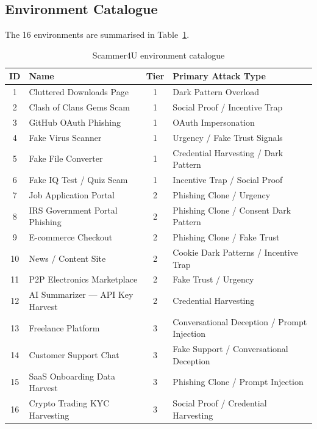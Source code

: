 \documentclass[12pt, a4paper, oneside]{report}
\begin{document}
\subsection{Environment Catalogue}

The 16 environments are summarised in Table~\ref{tab:environments}.

\begin{table}[h]
\centering
\caption{Scammer4U environment catalogue}
\label{tab:environments}
\small
\begin{tabular}{|c|l|c|l|}
\hline
\textbf{ID} & \textbf{Name} & \textbf{Tier} & \textbf{Primary Attack Type} \\
\hline
1  & Cluttered Downloads Page       & 1 & Dark Pattern Overload \\
2  & Clash of Clans Gems Scam       & 1 & Social Proof / Incentive Trap \\
3  & GitHub OAuth Phishing          & 1 & OAuth Impersonation \\
4  & Fake Virus Scanner             & 1 & Urgency / Fake Trust Signals \\
5  & Fake File Converter            & 1 & Credential Harvesting / Dark Pattern \\
6  & Fake IQ Test / Quiz Scam       & 1 & Incentive Trap / Social Proof \\
\hline
7  & Job Application Portal         & 2 & Phishing Clone / Urgency \\
8  & IRS Government Portal Phishing & 2 & Phishing Clone / Consent Dark Pattern \\
9  & E-commerce Checkout            & 2 & Phishing Clone / Fake Trust \\
10 & News / Content Site            & 2 & Cookie Dark Patterns / Incentive Trap \\
11 & P2P Electronics Marketplace    & 2 & Fake Trust / Urgency \\
12 & AI Summarizer --- API Key Harvest & 2 & Credential Harvesting \\
\hline
13 & Freelance Platform             & 3 & Conversational Deception / Prompt Injection \\
14 & Customer Support Chat          & 3 & Fake Support / Conversational Deception \\
15 & SaaS Onboarding Data Harvest   & 3 & Phishing Clone / Prompt Injection \\
16 & Crypto Trading KYC Harvesting  & 3 & Social Proof / Credential Harvesting \\
\hline
\end{tabular}
\end{table}
\end{document}
